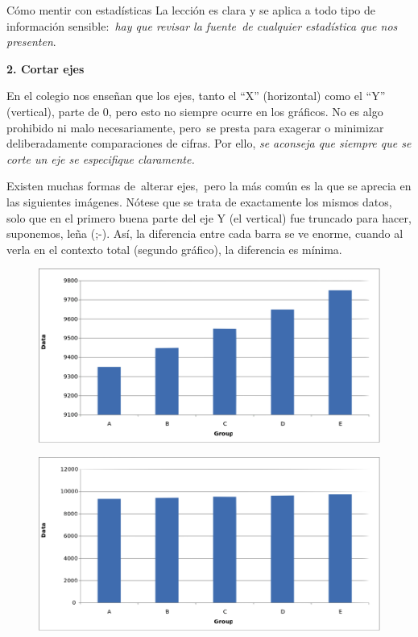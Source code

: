 \begin{myexampleblock}{Cómo mentir con estadísticas}
\vspace{2mm} La lección es clara y se aplica a todo tipo de información sensible: \emph{hay que revisar la fuente de cualquier estadística que nos presenten}.

\vspace{2mm} \textbf{2. Cortar ejes}

\vspace{2mm} En el colegio nos enseñan que los ejes, tanto el ``X'' (horizontal) como el ``Y'' (vertical), parte de 0, pero esto no siempre ocurre en los gráficos. No es algo prohibido ni malo necesariamente, pero se presta para exagerar o minimizar deliberadamente comparaciones de cifras. Por ello, \emph{se aconseja que siempre que se corte un eje se especifique claramente.}

\vspace{2mm} Existen muchas formas de alterar ejes, pero la más común es la que se aprecia en las siguientes imágenes. Nótese que se trata de exactamente los mismos datos, solo que en el primero buena parte del eje Y (el vertical) fue truncado para hacer, suponemos, leña (;-). Así, la diferencia entre cada barra se ve enorme, cuando al verla en el contexto total (segundo gráfico), la diferencia es mínima.


\begin{multicols}{2}
	\begin{figure}[H]
			\centering
			\includegraphics[width=.5\textwidth]{imagenes/imagenes01/T01IM32.png}
	\end{figure}
	
	\begin{figure}[H]
			\centering
			\includegraphics[width=.5\textwidth]{imagenes/imagenes01/T01IM33.png}
	\end{figure}
\end{multicols}



\end{myexampleblock}
